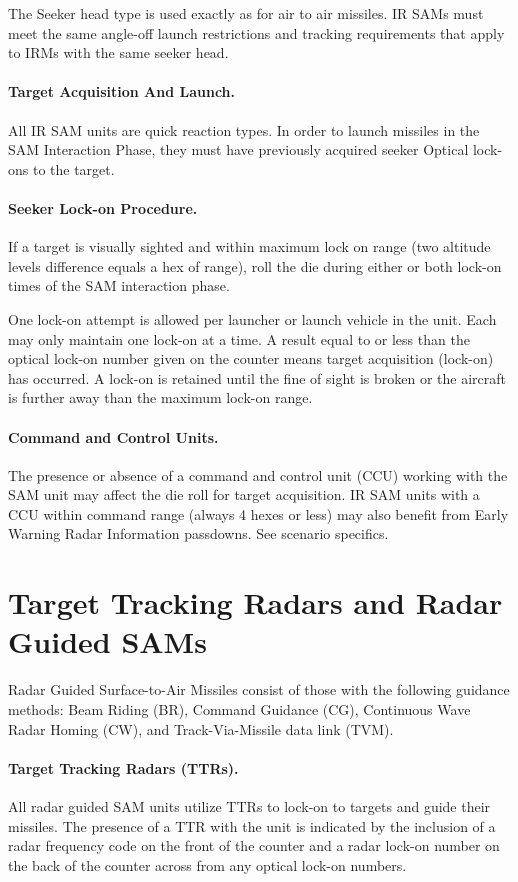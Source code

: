 The Seeker head type is used exactly as for air to air missiles. IR SAMs must meet the same angle-off launch restrictions and tracking requirements that apply to IRMs with the same seeker head.

\paragraph{Target Acquisition And Launch.} All IR SAM units are quick reaction types. In order to launch missiles in the SAM Interaction Phase, they must have previously acquired seeker Optical lock-ons to the target.

\paragraph{Seeker Lock-on Procedure.} If a target is visually sighted and within maximum lock on range (two altitude levels difference equals a hex of range), roll the die during either or both lock-on times of the SAM interaction phase.

One lock-on attempt is allowed per launcher or launch vehicle in the unit. Each may only maintain one lock-on at a time. A result equal to or less than the optical lock-on number given on the counter means target acquisition (lock-on) has occurred. A lock-on is retained until the fine of sight is broken or the aircraft is further away than the maximum lock-on range.

\paragraph{Command and Control Units.} The presence or absence of a command and control unit (CCU) working with the SAM unit may affect the die roll for target acquisition. IR SAM units with a CCU within command range (always 4 hexes or less) may also benefit from Early Warning Radar Information passdowns. See scenario specifics.

\section{Target Tracking Radars and Radar Guided SAMs}
\label{rule:radar-guided-sams}

Radar Guided Surface-to-Air Missiles consist of those with the following guidance methods: Beam Riding (BR), Command Guidance (CG), Continuous Wave Radar Homing (CW), and Track-Via-Missile data link (TVM).

\paragraph{Target Tracking Radars (TTRs).} All radar guided SAM units utilize TTRs to lock-on to targets and guide their missiles. The presence of a TTR with the unit is indicated by the inclusion of a radar frequency code on the front of the counter and a radar lock-on number on the back of the counter across from any optical lock-on numbers.

